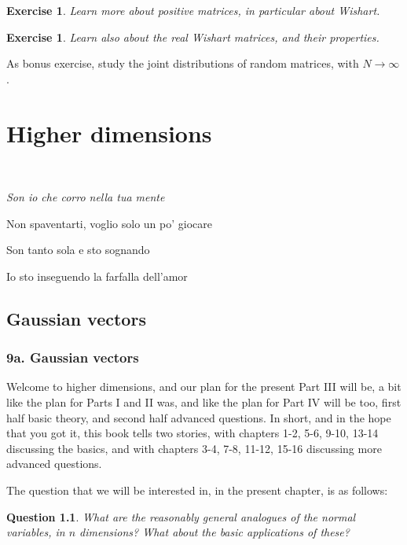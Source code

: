 \documentclass[12pt]{amsbook}
\newtheorem{exercise}[theorem]{Exercise}
\newtheorem{question}[theorem]{Question}
\begin{document}
\begin{exercise}
Learn more about positive matrices, in particular about Wishart.
\end{exercise}

\begin{exercise}
Learn also about the real Wishart matrices, and their properties.
\end{exercise}

As bonus exercise, study the joint distributions of random matrices, with $N\to\infty$.

\part{Higher dimensions}

\ \vskip50mm

\begin{center}
{\em Son io che corro nella tua mente

Non spaventarti, voglio solo un po' giocare

Son tanto sola e sto sognando

Io sto inseguendo la farfalla dell'amor}
\end{center}

\chapter{Gaussian vectors}

\section*{9a. Gaussian vectors}

Welcome to higher dimensions, and our plan for the present Part III will be, a bit like the plan for Parts I and II was, and like the plan for Part IV will be too, first half basic theory, and second half advanced questions. In short, and in the hope that you got it, this book tells two stories, with chapters 1-2, 5-6, 9-10, 13-14 discussing the basics, and with chapters 3-4, 7-8, 11-12, 15-16 discussing more advanced questions.

\bigskip

The question that we will be interested in, in the present chapter, is as follows:

\begin{question}
What are the reasonably general analogues of the normal variables, in $n$ dimensions? What about the basic applications of these?
\end{question} 
\end{document}
